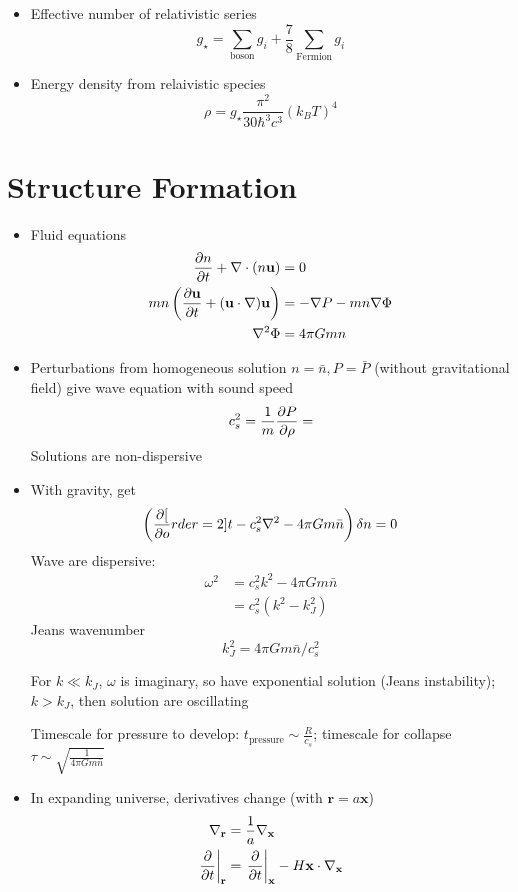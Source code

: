 \begin{itemize}
    \item Effective number of relativistic series \[g_\star = \sum_\text{boson} g_i + \frac{7}{8}\sum_\text{Fermion} g_i \]
    \item Energy density from relaivistic species 
    \[\rho = g_\star \frac{\pi^2}{30\hbar^3 c^3} (k_BT)^4\]
\end{itemize}
\section{Structure Formation}
\begin{itemize}
\item Fluid equations
\begin{align*}
    \frac{\partial{n }}{\partial{t}} + \nabla\cdot(n \mathbf{u}) &= 0 \\
    mn \left( \frac{\partial{\mathbf{u}}}{\partial{t}}  + (\mathbf{u} \cdot \nabla)\mathbf{u}  \right) &= -\mathbf{\nabla} P - mn \mathbf{\nabla} \Phi \\
    \nabla^2 \Phi &= 4\pi G mn
\end{align*}
\item Perturbations from homogeneous solution $n=\bar{n}, P = \bar{P}$ (without gravitational field) give wave equation with sound speed \[c_s^2 = \frac{1}{m}\frac{\partial{P}}{\partial{\rho}} = \]
Solutions are non-dispersive

\item With gravity, get 
\[\left(\frac{\partial{[}}{\partial{o}}rder=2]{}{t}-c_s^2 \nabla^2 -4\pi G m \bar{n}\right)\delta n = 0\]
Wave are dispersive: 
\begin{align*}
    \omega^2 &= c_s^2k^2 -4\pi G m \bar{n} \\
    &= c_s^2(k^2-k_J^2)
\end{align*}
Jeans wavenumber \[k_J^2 = 4\pi Gm \bar{n}/c_s^2\]

For $k\ll k_J$, $\omega$ is imaginary, so have exponential solution (Jeans instability); $k>k_J$, then solution are oscillating

Timescale for pressure to develop: $t_\text{pressure} \sim \frac{R}{c_s}$; timescale for collapse $\tau \sim \sqrt{\frac{1}{4\pi Gm \bar{n}}}$

\item In expanding universe, derivatives change (with $\mathbf{r} = a \mathbf{x}$)
\begin{align*}
    \nabla_\mathbf{r} &= \frac{1}{a}\nabla_\mathbf{x}\\
    \left. \frac{\partial{}}{\partial{t}}\right|_{\mathbf{r}} &= \left. \frac{\partial{}}{\partial{t}}\right|_{\mathbf{x}} -H \mathbf{x} \cdot \nabla_\mathbf{x}
\end{align*}


\end{itemize}
